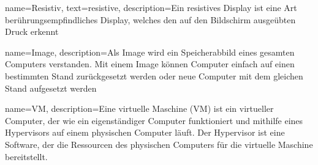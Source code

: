{
	name=Resistiv,
    	text=resistive,
	description={Ein resistives Display ist eine Art berührungsempfindliches Display, welches den auf den Bildschirm ausgeübten Druck erkennt}
}

{
	name=Image,
	description={Als Image wird ein Speicherabbild eines gesamten Computers verstanden. Mit einem Image können Computer einfach auf einen bestimmten Stand zurückgesetzt werden oder neue Computer mit dem gleichen Stand aufgesetzt werden}
}

{
	name=VM,
	description={Eine virtuelle Maschine (VM) ist ein virtueller Computer, der wie ein eigenständiger Computer funktioniert und mithilfe eines Hypervisors auf einem physischen Computer läuft. Der Hypervisor ist eine Software, der die Ressourcen des physischen Computers für die virtuelle Maschine bereitstellt.}
}

